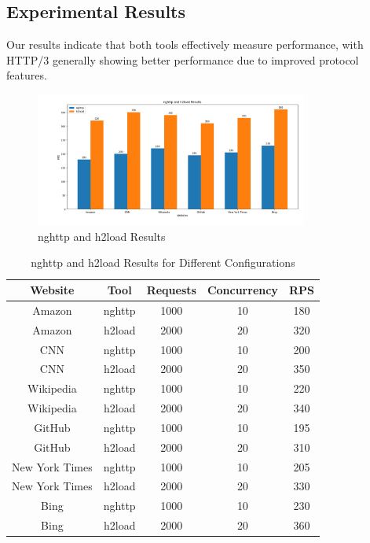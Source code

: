 \documentclass[a4paper,10pt]{article}
\begin{document}
\subsection{Experimental Results}
Our results indicate that both tools effectively measure performance, with HTTP/3 generally showing better performance due to improved protocol features.

\begin{figure}[H]
\centering
\includegraphics[width=0.8\textwidth]{Figure4.png}
\caption{nghttp and h2load Results}
\label{fig:nghttp_h2load_results}
\end{figure}

\begin{table}[H]
\centering
\begin{tabular}{|c|c|c|c|c|}
\hline
\textbf{Website} & \textbf{Tool} & \textbf{Requests} & \textbf{Concurrency} & \textbf{RPS} \\
\hline
Amazon & nghttp & 1000 & 10 & 180 \\
Amazon & h2load & 2000 & 20 & 320 \\
CNN & nghttp & 1000 & 10 & 200 \\
CNN & h2load & 2000 & 20 & 350 \\
Wikipedia & nghttp & 1000 & 10 & 220 \\
Wikipedia & h2load & 2000 & 20 & 340 \\
GitHub & nghttp & 1000 & 10 & 195 \\
GitHub & h2load & 2000 & 20 & 310 \\
New York Times & nghttp & 1000 & 10 & 205 \\
New York Times & h2load & 2000 & 20 & 330 \\
Bing & nghttp & 1000 & 10 & 230 \\
Bing & h2load & 2000 & 20 & 360 \\
\hline
\end{tabular}
\caption{nghttp and h2load Results for Different Configurations}
\label{tab:nghttp_h2load_results}
\end{table}
\end{document}
